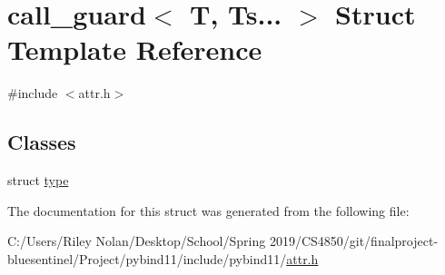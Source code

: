 \hypertarget{structcall__guard_3_01_t_00_01_ts_8_8_8_01_4}{}\section{call\+\_\+guard$<$ T, Ts... $>$ Struct Template Reference}
\label{structcall__guard_3_01_t_00_01_ts_8_8_8_01_4}


{\ttfamily \#include $<$attr.\+h$>$}

\subsection*{Classes}
\begin{DoxyCompactItemize}
\item 
struct \mbox{\hyperlink{structcall__guard_3_01_t_00_01_ts_8_8_8_01_4_1_1type}{type}}
\end{DoxyCompactItemize}


The documentation for this struct was generated from the following file\+:\begin{DoxyCompactItemize}
\item 
C\+:/\+Users/\+Riley Nolan/\+Desktop/\+School/\+Spring 2019/\+C\+S4850/git/finalproject-\/bluesentinel/\+Project/pybind11/include/pybind11/\mbox{\hyperlink{attr_8h}{attr.\+h}}\end{DoxyCompactItemize}
